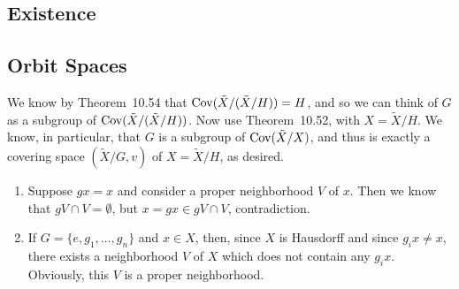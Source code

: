 \documentclass[../../solutions.tex]{subfiles}
\begin{document}
\subsection{Existence}
\begin{exercise} \leavevmode

\end{exercise}

\begin{exercise} \leavevmode

\end{exercise}

\begin{exercise} \leavevmode

\end{exercise}

\begin{exercise} \leavevmode

\end{exercise}

\begin{exercise} \leavevmode

\end{exercise}

\subsection{Orbit Spaces}
\begin{exercise} \leavevmode
We know by Theorem~10.54 that $\operatorname{Cov}(\tilde X/(\tilde X/H))=H$, and so we can think of $G$ as a subgroup of $\operatorname{Cov}(\tilde X/(\tilde X/H))$.
Now use Theorem~10.52, with $X=\tilde X/H$.
We know, in particular, that $G$ is a subgroup of $\operatorname{Cov}(\tilde X/X)$, and thus is exactly a covering space $(\tilde X/G,v)$ of $X=\tilde X/H$, as desired.
\end{exercise}

\begin{exercise} \leavevmode
\begin{enumerate}
\item
Suppose $gx=x$ and consider a proper neighborhood $V$ of $x$.
Then we know that $gV\cap V=\emptyset$, but $x=gx\in gV\cap V$, contradiction.

\item
If $G=\{e,g_1,\dots,g_n\}$ and $x\in X$, then, since $X$ is Hausdorff and since $g_ix\ne x$, there exists a neighborhood $V$ of $X$ which does not contain any $g_ix$.
Obviously, this $V$ is a proper neighborhood.
\end{enumerate}
\end{exercise}
\end{document}
